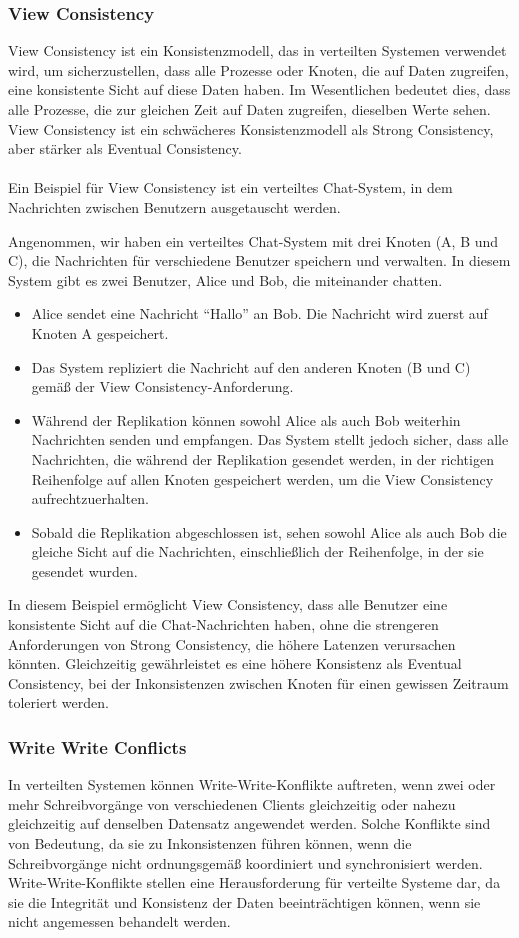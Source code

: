 \documentclass[../vs-script-first-v01.tex]{subfiles}
\begin{document}
\subsubsection{View Consistency}

View Consistency ist ein Konsistenzmodell, das in verteilten Systemen verwendet wird, um sicherzustellen, dass alle Prozesse oder Knoten, die auf Daten zugreifen, eine konsistente Sicht auf diese Daten haben. Im Wesentlichen bedeutet dies, dass alle Prozesse, die zur gleichen Zeit auf Daten zugreifen, dieselben Werte sehen. View Consistency ist ein schwächeres Konsistenzmodell als Strong Consistency, aber stärker als Eventual Consistency.
\\\\
Ein  Beispiel für View Consistency ist ein verteiltes Chat-System, in dem Nachrichten zwischen Benutzern ausgetauscht werden.

Angenommen, wir haben ein verteiltes Chat-System mit drei Knoten (A, B und C), die Nachrichten für verschiedene Benutzer speichern und verwalten. In diesem System gibt es zwei Benutzer, Alice und Bob, die miteinander chatten.
\begin{itemize}
\item Alice sendet eine Nachricht \enquote{Hallo} an Bob. Die Nachricht wird zuerst auf Knoten A gespeichert.
\item Das System repliziert die Nachricht auf den anderen Knoten (B und C) gemäß der View Consistency-Anforderung.
\item Während der Replikation können sowohl Alice als auch Bob weiterhin Nachrichten senden und empfangen. Das System stellt jedoch sicher, dass alle Nachrichten, die während der Replikation gesendet werden, in der richtigen Reihenfolge auf allen Knoten gespeichert werden, um die View Consistency aufrechtzuerhalten.
\item Sobald die Replikation abgeschlossen ist, sehen sowohl Alice als auch Bob die gleiche Sicht auf die Nachrichten, einschließlich der Reihenfolge, in der sie gesendet wurden.
\end{itemize}
In diesem Beispiel ermöglicht View Consistency, dass alle Benutzer eine konsistente Sicht auf die Chat-Nachrichten haben, ohne die strengeren Anforderungen von Strong Consistency, die höhere Latenzen verursachen könnten. Gleichzeitig gewährleistet es eine höhere Konsistenz als Eventual Consistency, bei der Inkonsistenzen zwischen Knoten für einen gewissen Zeitraum toleriert werden.

\subsubsection{Write Write Conflicts}
In verteilten Systemen können Write-Write-Konflikte auftreten, wenn zwei oder mehr Schreibvorgänge von verschiedenen Clients gleichzeitig oder nahezu gleichzeitig auf denselben Datensatz angewendet werden. Solche Konflikte sind von Bedeutung, da sie zu Inkonsistenzen führen können, wenn die Schreibvorgänge nicht ordnungsgemäß koordiniert und synchronisiert werden. Write-Write-Konflikte stellen eine Herausforderung für verteilte Systeme dar, da sie die Integrität und Konsistenz der Daten beeinträchtigen können, wenn sie nicht angemessen behandelt werden.
\end{document}
